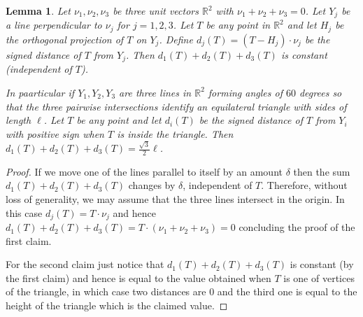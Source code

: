 \documentclass{article}
\newcommand{\RR}{\mathbb R}
\newtheorem{lemma}[theorem]{Lemma}
\theoremstyle{definition}
\theoremstyle{remark}
\begin{document}
\begin{lemma}\label{lm:tripod}
  Let $\nu_1,\nu_2,\nu_3$ be three unit vectors $\RR^2$
  with $\nu_1+\nu_2+\nu_3=0$. 
  Let $Y_j$ be a line perpendicular to $\nu_j$ for $j=1,2,3$.
  Let $T$ be any point in $\RR^2$ and let $H_j$ be the orthogonal 
  projection of $T$ on $Y_j$.
  Define $d_j(T) = (T-H_j)\cdot \nu_j$
  be the signed distance of $T$ from $Y_j$.
  Then $d_1(T) + d_2(T) + d_3(T)$ is constant (independent of $T$).

  In paarticular if $Y_1,Y_2,Y_3$ are three lines in $\RR^2$
  forming angles of $60$ degrees so that 
  the three pairwise intersections identify
  an equilateral triangle with sides of length $\ell$.
  Let $T$ be any point and let $d_i(T)$ be 
  the signed distance of $T$ from $Y_i$
  with positive sign when $T$ is inside the triangle.
  Then $d_1(T) + d_2(T) + d_3(T) = \frac{\sqrt 3}{2}\ell$.
\end{lemma}
\begin{proof}
  If we move one of the lines parallel to itself by an amount $\delta$ 
  then the sum $d_1(T)+d_2(T)+d_3(T)$ changes by $\delta$, independent 
  of $T$.
  Therefore, without loss of generality, we may assume that the three lines 
  intersect in the origin.
  In this case $d_j(T) = T\cdot \nu_j$ and hence 
  $d_1(T)+d_2(T)+d_3(T) = T\cdot (\nu_1+\nu_2+\nu_3) = 0$
  concluding the proof of the first claim.

  For the second claim just notice that $d_1(T)+d_2(T)+d_3(T)$
  is constant (by the first claim) and hence is equal to the value 
  obtained when $T$ is one of vertices of the triangle, in which case 
  two distances are $0$ and the third one is equal to the height of the 
  triangle which is the claimed value.
\end{proof}
\end{document}
